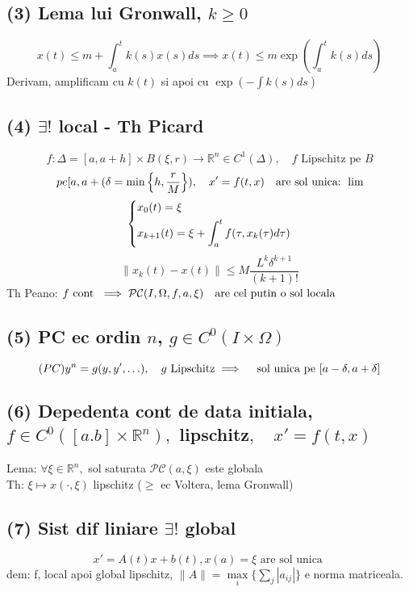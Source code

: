 \documentclass{article}
\newcommand*{\R}{\mathbb{R}}
\newcommand*{\PC}{\mathcal{PC}}
\begin{document}
\subsection*{(3) Lema lui Gronwall, $k \geq 0$}
\[x(t) \leq m + \int_a^t k(s) x(s) ds \implies x(t) \leq m \exp(\int_a^t k(s)ds) \]
Derivam, amplificam cu $k(t)$ si apoi cu $\exp(-\int k(s) ds)$
\subsection*{(4) $\exists!$ local - Th Picard}
\[f : \Delta = [a, a+h] \times B(\xi, r) \to \R^n \in C^1(\Delta), \quad f \text{  Lipschitz pe } B \]
\[pe [a, a+ (\delta = \min\left\{h, \frac{r}{M}\right\}), \quad x' = f(t, x) \text{\quad are sol unica: }\lim \]
\[
  \begin{dcases}
    x_0(t) = \xi\\
    x_{k+1}(t) = \xi + \int_a^t f(\tau, x_k(\tau) d\tau)
  \end{dcases}\]
\[  \| x_k(t) - x(t) \| \leq M \frac{L^k\delta^{k+1}}{(k+1)!} \]
Th Peano: $ f \text{ cont } \implies \mathcal{PC} (I, \Omega, f, a, \xi) \text{\quad are cel putin o sol locala}$

\subsection*{(5) PC ec ordin $n$, $g \in C^0(I\times \Omega)$}
\[(PC) y^{n} = g(y, y', \ldots), \quad g \text {  Lipschitz} \implies \text{\quad sol unica pe } [a -\delta, a+\delta ] \]

\subsection*{(6) Depedenta cont de data initiala, $f \in C^0([a. b] \times \R^n),$ lipschitz$, \quad x' = f(t, x)$}
Lema: $\forall \xi \in \R^n,$ sol saturata $\PC(a, \xi)$ este globala\\
Th: $\xi \mapsto x(\cdot, \xi)$ lipschitz ($\geq$ ec Voltera, lema Gronwall)
\subsection*{(7) Sist dif liniare $\exists!$ global}
\[x' = A(t)x +b(t), x(a) = \xi \text{ are sol unica   } \]
dem: f, local apoi global lipschitz,  $\| A \| = \max\limits_i \{ \sum\limits_j |a_{ij}| \} $ e norma matriceala.
\end{document}
